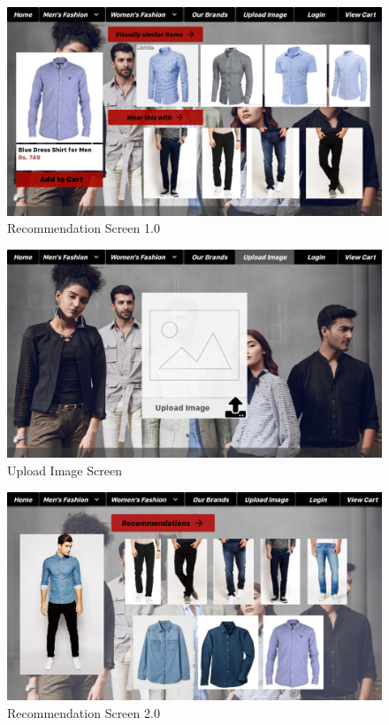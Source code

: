   \begin{figure}[H]
  \includegraphics[width=15cm]{images/ProductDetailsScreen.pdf} 
  \centering
  \caption{Recommendation Screen 1.0}
  \label{gui:product3}
  \end{figure}
  \begin{figure}[H]
  \includegraphics[width=15cm]{images/UploadImageScreen.pdf} 
  \centering
  \caption{Upload Image Screen}
  \label{gui:upload1}
  \end{figure}
  
  \begin{figure}[H]
  \includegraphics[width=15cm]{images/UploadedImagedetailsScreen.pdf} 
  \centering
  \caption{Recommendation Screen 2.0}
  \label{gui:upload2}
  \end{figure}

